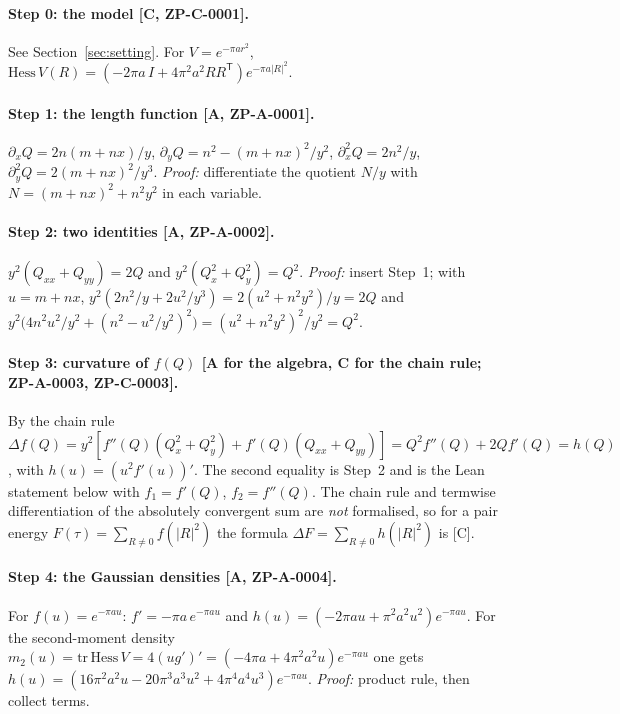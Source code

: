 \documentclass[10pt]{article}
\newcommand{\tier}[1]{\textsf{[#1]}}
\begin{document}
\paragraph{Step 0: the model \tier{C, ZP-C-0001}.} See Section~\ref{sec:setting}. For $V=e^{-\pi a r^2}$,
$\mathrm{Hess}\,V(R)=(-2\pi a\,I+4\pi^2a^2RR^{\mathsf T})e^{-\pi a|R|^2}$.

\paragraph{Step 1: the length function \tier{A, ZP-A-0001}.} $\partial_xQ=2n(m+nx)/y$, $\partial_yQ=n^2-(m+nx)^2/y^2$,
$\partial_x^2Q=2n^2/y$, $\partial_y^2Q=2(m+nx)^2/y^3$. \emph{Proof:} differentiate the quotient $N/y$ with
$N=(m+nx)^2+n^2y^2$ in each variable.


\paragraph{Step 2: two identities \tier{A, ZP-A-0002}.} $y^2(Q_{xx}+Q_{yy})=2Q$ and $y^2(Q_x^2+Q_y^2)=Q^2$. \emph{Proof:} insert Step~1; with
$u=m+nx$, $y^2(2n^2/y+2u^2/y^3)=2(u^2+n^2y^2)/y=2Q$ and $y^2\bigl(4n^2u^2/y^2+(n^2-u^2/y^2)^2\bigr)=(u^2+n^2y^2)^2/y^2=Q^2$.


\paragraph{Step 3: curvature of $f(Q)$ \tier{A for the algebra, C for the chain rule; ZP-A-0003, ZP-C-0003}.} By the chain rule
$\Delta f(Q)=y^2[f''(Q)(Q_x^2+Q_y^2)+f'(Q)(Q_{xx}+Q_{yy})]=Q^2f''(Q)+2Qf'(Q)=h(Q)$, with $h(u)=(u^2f'(u))'$. The second equality is Step~2 and is
the Lean statement below with $f_1=f'(Q)$, $f_2=f''(Q)$. The chain rule and termwise differentiation of the absolutely convergent
sum are \emph{not} formalised, so for a pair energy $F(\tau)=\sum_{R\ne0}f(|R|^2)$ the formula $\Delta F=\sum_{R\ne0}h(|R|^2)$ is \tier{C}.


\paragraph{Step 4: the Gaussian densities \tier{A, ZP-A-0004}.} For $f(u)=e^{-\pi au}$: $f'=-\pi a\,e^{-\pi au}$ and
$h(u)=(-2\pi au+\pi^2a^2u^2)e^{-\pi au}$. For the second-moment density $m_2(u)=\mathrm{tr}\,\mathrm{Hess}\,V=4(ug')'=(-4\pi a+4\pi^2a^2u)e^{-\pi au}$ one gets
$h(u)=(16\pi^2a^2u-20\pi^3a^3u^2+4\pi^4a^4u^3)e^{-\pi au}$. \emph{Proof:} product rule, then collect terms.

\end{document}
